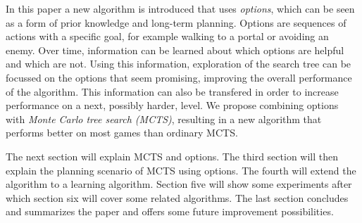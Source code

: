 In this paper a new algorithm is introduced that uses \emph{options}, which can
be seen as a form of prior knowledge and long-term planning. Options are
sequences of actions with a specific goal, for example walking to a portal or
avoiding an enemy. Over time, information can be learned about which options are
helpful and which are not. Using this information, exploration of
the search tree can be focussed on the options that seem promising, improving
the overall performance of the algorithm. This information can also be
transfered in order to increase performance on a next, possibly harder, level.
We propose combining options with \emph{Monte Carlo tree search (MCTS)},
resulting in a new algorithm that performs better on most games than ordinary
MCTS.

The next section will explain MCTS and options. The third section will then
explain the planning scenario of MCTS using options. The fourth will extend the
algorithm to a learning algorithm. Section five will show some experiments after
which section six will cover some related algorithms. The last section concludes
and summarizes the paper and offers some future improvement possibilities.
